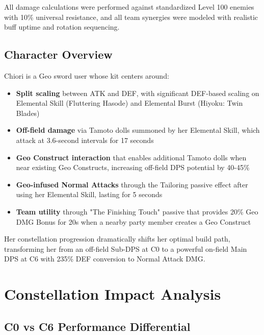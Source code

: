 \documentclass[12pt,a4paper]{article}
\begin{document}
All damage calculations were performed against standardized Level 100 enemies with 10\% universal resistance, and all team synergies were modeled with realistic buff uptime and rotation sequencing.

\subsection{Character Overview}

Chiori is a Geo sword user whose kit centers around:

\begin{itemize}
    \item \textbf{Split scaling} between ATK and DEF, with significant DEF-based scaling on Elemental Skill (Fluttering Hasode) and Elemental Burst (Hiyoku: Twin Blades)
    \item \textbf{Off-field damage} via Tamoto dolls summoned by her Elemental Skill, which attack at 3.6-second intervals for 17 seconds
    \item \textbf{Geo Construct interaction} that enables additional Tamoto dolls when near existing Geo Constructs, increasing off-field DPS potential by 40-45\%
    \item \textbf{Geo-infused Normal Attacks} through the Tailoring passive effect after using her Elemental Skill, lasting for 5 seconds
    \item \textbf{Team utility} through "The Finishing Touch" passive that provides 20\% Geo DMG Bonus for 20s when a nearby party member creates a Geo Construct
\end{itemize}

Her constellation progression dramatically shifts her optimal build path, transforming her from an off-field Sub-DPS at C0 to a powerful on-field Main DPS at C6 with 235\% DEF conversion to Normal Attack DMG.

\section{Constellation Impact Analysis}

\subsection{C0 vs C6 Performance Differential}
\end{document}

